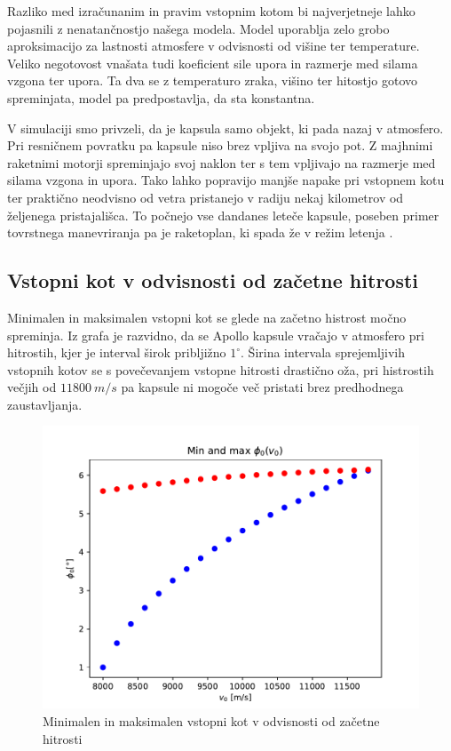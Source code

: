 \documentclass[11pt,a4paper]{article}
\begin{document}
Razliko med izra\v cunanim in pravim vstopnim kotom bi najverjetneje lahko pojasnili z nenatan\v cnostjo na\v sega modela. Model uporablja zelo grobo aproksimacijo za lastnosti atmosfere v odvisnosti od vi\v sine ter temperature. Veliko negotovost vna\v sata tudi koeficient sile upora in razmerje med silama vzgona ter upora. Ta dva se z temperaturo zraka, vi\v sino ter hitostjo gotovo spreminjata, model pa predpostavlja, da sta konstantna.

V simulaciji smo privzeli, da je kapsula samo objekt, ki pada nazaj v atmosfero. Pri resni\v cnem povratku pa kapsule niso brez vpljiva na svojo pot. Z majhnimi raketnimi motorji spreminjajo svoj naklon ter s tem vpljivajo na razmerje med silama vzgona in upora. Tako lahko popravijo manj\v se napake pri vstopnem kotu ter prakti\v cno neodvisno od vetra pristanejo v radiju nekaj kilometrov od \v zeljenega pristajali\v sca. To po\v cnejo vse dandanes lete\v ce kapsule, poseben primer tovrstnega manevriranja pa je raketoplan, ki spada \v ze v re\v zim letenja \cite{raketoplan-wiki}.

\subsection{Vstopni kot v odvisnosti od za\v cetne hitrosti}

Minimalen in maksimalen vstopni kot se glede na za\v cetno histrost mo\v cno spreminja. Iz grafa je razvidno, da se Apollo kapsule vra\v cajo v atmosfero pri hitrostih, kjer je interval \v sirok priblji\v zno $ 1^\circ $. \v Sirina intervala sprejemljivih vstopnih kotov se s pove\v cevanjem vstopne hitrosti drasti\v cno o\v za, pri histrostih ve\v cjih od $ 11800\ m/s $ pa kapsule ni mogo\v ce ve\v c pristati brez predhodnega zaustavljanja.

\begin{figure}[H]
	\begin{center}
		\includegraphics[width=12cm]{range_of_velocity.pdf}
		\caption{Minimalen in maksimalen vstopni kot v odvisnosti od za\v cetne hitrosti}
	\end{center}
\end{figure}
\clearpage
\end{document}
